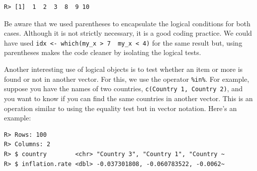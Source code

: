 \documentclass[
  12pt,
]{book}
\newenvironment{Shaded}{\begin{snugshade}}{\end{snugshade}}
\newcommand{\CommentTok}[1]{\textcolor[rgb]{0.37,0.37,0.37}{\textit{#1}}}
\newcommand{\DataTypeTok}[1]{\textcolor[rgb]{0.27,0.27,0.27}{#1}}
\newcommand{\DecValTok}[1]{\textcolor[rgb]{0.06,0.06,0.06}{#1}}
\newcommand{\FloatTok}[1]{\textcolor[rgb]{0.06,0.06,0.06}{#1}}
\newcommand{\KeywordTok}[1]{\textcolor[rgb]{0.27,0.27,0.27}{\textbf{#1}}}
\newcommand{\NormalTok}[1]{#1}
\newcommand{\OperatorTok}[1]{\textcolor[rgb]{0.43,0.43,0.43}{\textbf{#1}}}
\newcommand{\OtherTok}[1]{\textcolor[rgb]{0.37,0.37,0.37}{#1}}
\newcommand{\StringTok}[1]{\textcolor[rgb]{0.5,0.5,0.5}{#1}}
\begin{document}
\begin{verbatim}
R> [1]  1  2  3  8  9 10
\end{verbatim}

Be aware that we used parentheses to encapsulate the logical conditions for both cases. Although it is not strictly necessary, it is a good coding practice. We could have used \texttt{idx\ \textless{}-\ which(my\_x\ \textgreater{}\ 7\ \textbar{}\ my\_x\ \textless{}\ 4)} for the same result but, using parentheses makes the code cleaner by isolating the logical tests.

Another interesting use of logical objects is to test whether an item or more is found or not in another vector. For this, we use the operator \texttt{\%in\%}. For example, suppose you have the names of two countries, \texttt{c(\textquotesingle{}Country\ 1\textquotesingle{},\ \textquotesingle{}Country\ 2\textquotesingle{})}, and you want to know if you can find the same countries in another vector. This is an operation similar to using the equality test but in vector notation. Here's an example:

\begin{Shaded}
\end{Shaded}

\begin{verbatim}
R> Rows: 100
R> Columns: 2
R> $ country        <chr> "Country 3", "Country 1", "Country ~
R> $ inflation.rate <dbl> -0.037301808, -0.060783522, -0.0062~
\end{verbatim}
\end{document}
